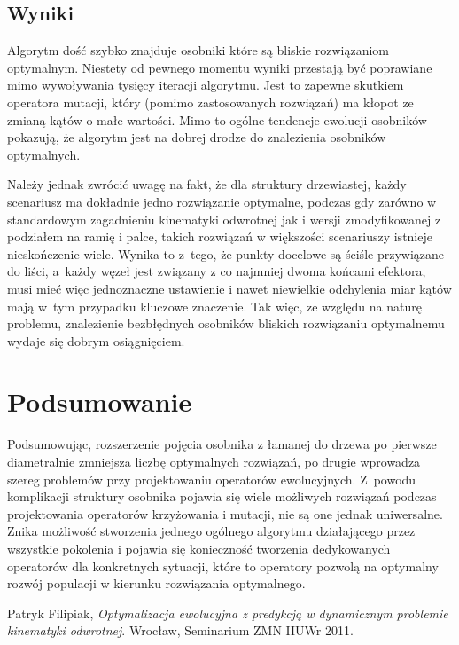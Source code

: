 \documentclass[11pt, leqno]{article}
\begin{document}
\subsection{Wyniki}
Algorytm dość szybko znajduje osobniki które są bliskie rozwiązaniom optymalnym. Niestety od pewnego momentu wyniki przestają być poprawiane mimo wywoływania tysięcy iteracji algorytmu. Jest to zapewne skutkiem operatora mutacji, który (pomimo zastosowanych rozwiązań) ma kłopot ze zmianą kątów o małe wartości. Mimo to ogólne tendencje ewolucji osobników pokazują, że algorytm jest na dobrej drodze do znalezienia osobników optymalnych.

Należy jednak zwrócić uwagę na fakt, że dla struktury drzewiastej, każdy scenariusz ma dokładnie jedno rozwiązanie optymalne, podczas gdy zarówno w standardowym zagadnieniu kinematyki odwrotnej jak i wersji zmodyfikowanej z podziałem na ramię i palce, takich rozwiązań w większości scenariuszy istnieje nieskończenie wiele. Wynika to z~tego, że punkty docelowe są ściśle przywiązane do liści, a~każdy węzeł jest związany z co najmniej dwoma końcami efektora, musi mieć więc jednoznaczne ustawienie i nawet niewielkie odchylenia miar kątów mają w~tym przypadku kluczowe znaczenie. Tak więc, ze względu na naturę problemu, znalezienie bezbłędnych osobników bliskich rozwiązaniu optymalnemu wydaje się dobrym osiągnięciem.


\section{Podsumowanie}
Podsumowując, rozszerzenie pojęcia osobnika z łamanej do drzewa po pierwsze diametralnie zmniejsza liczbę optymalnych rozwiązań, po drugie wprowadza szereg problemów przy projektowaniu operatorów ewolucyjnych. Z~powodu komplikacji struktury osobnika pojawia się wiele możliwych rozwiązań podczas projektowania operatorów krzyżowania i mutacji, nie są one jednak uniwersalne. Znika możliwość stworzenia jednego ogólnego algorytmu działającego przez wszystkie pokolenia i pojawia się konieczność tworzenia dedykowanych operatorów dla konkretnych sytuacji, które to operatory pozwolą na optymalny rozwój populacji w kierunku rozwiązania optymalnego.


\begin{thebibliography}{1}
	 Patryk Filipiak, {\it Optymalizacja ewolucyjna z predykcją w dynamicznym problemie kinematyki odwrotnej}. Wrocław, Seminarium ZMN IIUWr 2011.
\end{thebibliography}
\end{document}
